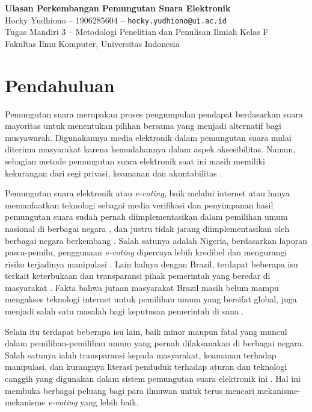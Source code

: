 \documentclass[12pt, a4paper, final]{article}
\begin{document}
\begin{center}
    \Large
    \textbf{Ulasan Perkembangan Pemungutan Suara Elektronik\\}
    \vspace{0.2cm}
    \Large
    Hocky Yudhiono – 1906285604 --
    \texttt{hocky.yudhiono@ui.ac.id}\\
    \vspace{0.2cm}
    \large
    Tugas Mandiri 3 -- Metodologi Penelitian dan Penulisan Ilmiah Kelas F\\
    Fakultas Ilmu Komputer, Universitas Indonesia\\
\end{center}

\onehalfspacing

\section{Pendahuluan}

Pemungutan suara merupakan proses pengumpulan pendapat berdasarkan suara mayoritas untuk menentukan pilihan bersama yang menjadi alternatif bagi musyawarah. Digunakannya media elektronik dalam pemungutan suara mulai diterima masyarakat karena kemudahannya dalam aspek aksesibilitas. Namun, sebagian metode pemungutan suara elektronik saat ini masih memiliki kekurangan dari segi privasi, keamanan dan akuntabilitas \citep{7571928}. 

Pemungutan suara elektronik atau \textit{e-voting}, baik melalui internet atau hanya memanfaatkan teknologi sebagai media verifikasi dan penyimpanan hasil pemungutan suara sudah pernah diimplementasikan dalam pemilihan umum nasional di berbagai negara \citep{7001135}, dan justru tidak jarang diimplementasikan oleh berbagai negara berkembang \citep{reviewevote}. Salah satunya adalah Nigeria, berdasarkan laporan pasca-pemilu, penggunaan \textit{e-voting} dipercaya lebih kredibel dan mengurangi risiko terjadinya manipulasi \citep{nigeria}. Lain halnya dengan Brazil, terdapat beberapa isu terkait keterbukaan dan transparansi pihak pemerintah yang beredar di masyarakat \citep{avgerou}. Fakta bahwa jutaan masyarakat Brazil masih belum mampu mengakses teknologi internet untuk pemilihan umum yang bersifat global, juga menjadi salah satu masalah bagi keputusan pemerintah di sana \citep{mci/Filho2008}.

Selain itu terdapat beberapa isu lain, baik minor maupun fatal yang muncul dalam pemilihan-pemilihan umum yang pernah dilaksanakan di berbagai negara. Salah satunya ialah transparansi kepada masyarakat, keamanan terhadap manipulasi, dan kurangnya literasi penduduk terhadap aturan dan teknologi canggih yang digunakan dalam sistem pemungutan suara elektronik ini \citep{7001136}. Hal ini membuka berbagai peluang bagi para ilmuwan untuk terus mencari mekanisme-mekanisme \textit{e-voting} yang lebih baik.
\end{document}
